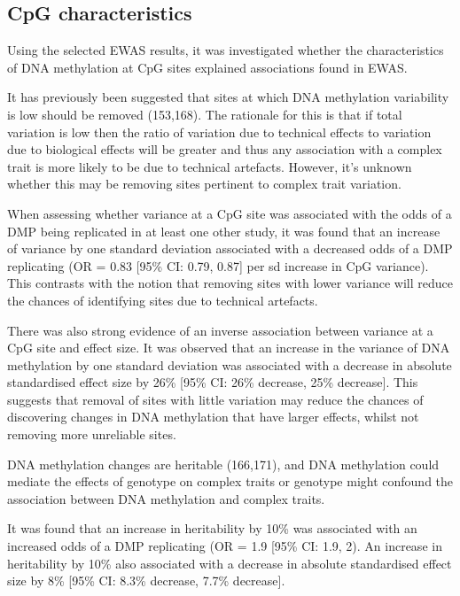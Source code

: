 \documentclass[11pt,twoside]{bristolthesis}
\begin{document}
\hypertarget{cpg-characteristics}{%
\subsection{CpG characteristics}\label{cpg-characteristics}}

Using the selected EWAS results, it was investigated whether the characteristics of DNA methylation at CpG sites explained associations found in EWAS.

It has previously been suggested that sites at which DNA methylation variability is low should be removed (153,168). The rationale for this is that if total variation is low then the ratio of variation due to technical effects to variation due to biological effects will be greater and thus any association with a complex trait is more likely to be due to technical artefacts. However, it's unknown whether this may be removing sites pertinent to complex trait variation.

When assessing whether variance at a CpG site was associated with the odds of a DMP being replicated in at least one other study, it was found that an increase of variance by one standard deviation associated with a decreased odds of a DMP replicating (OR = 0.83 {[}95\% CI: 0.79, 0.87{]} per sd increase in CpG variance). This contrasts with the notion that removing sites with lower variance will reduce the chances of identifying sites due to technical artefacts.

There was also strong evidence of an inverse association between variance at a CpG site and effect size. It was observed that an increase in the variance of DNA methylation by one standard deviation was associated with a decrease in absolute standardised effect size by 26\% {[}95\% CI: 26\% decrease, 25\% decrease{]}. This suggests that removal of sites with little variation may reduce the chances of discovering changes in DNA methylation that have larger effects, whilst not removing more unreliable sites.

DNA methylation changes are heritable (166,171), and DNA methylation could mediate the effects of genotype on complex traits or genotype might confound the association between DNA methylation and complex traits.

It was found that an increase in heritability by 10\% was associated with an increased odds of a DMP replicating (OR = 1.9 {[}95\% CI: 1.9, 2). An increase in heritability by 10\% also associated with a decrease in absolute standardised effect size by 8\% {[}95\% CI: 8.3\% decrease, 7.7\% decrease{]}.
\end{document}
